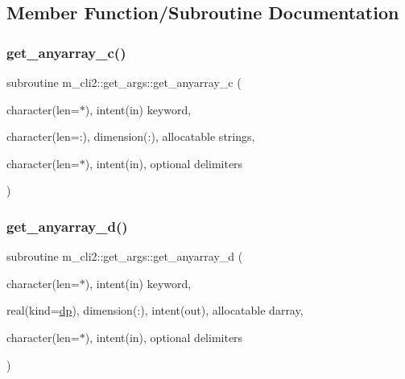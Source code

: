 \subsection{Member Function/\+Subroutine Documentation}
\mbox{\label{interfacem__cli2_1_1get__args_aa60d116ceb254630c102ef174471e375}} 
\subsubsection{\texorpdfstring{get\+\_\+anyarray\+\_\+c()}{get\_anyarray\_c()}}
{\footnotesize\ttfamily subroutine m\+\_\+cli2\+::get\+\_\+args\+::get\+\_\+anyarray\+\_\+c (\begin{DoxyParamCaption}\item[{character(len=$\ast$), intent(in)}]{keyword,  }\item[{character(len=\+:), dimension(\+:), allocatable}]{strings,  }\item[{character(len=$\ast$), intent(in), optional}]{delimiters }\end{DoxyParamCaption})\hspace{0.3cm}{\ttfamily [private]}}

\mbox{\label{interfacem__cli2_1_1get__args_ac1595f7435cd331533eade965bb371dc}} 
\subsubsection{\texorpdfstring{get\+\_\+anyarray\+\_\+d()}{get\_anyarray\_d()}}
{\footnotesize\ttfamily subroutine m\+\_\+cli2\+::get\+\_\+args\+::get\+\_\+anyarray\+\_\+d (\begin{DoxyParamCaption}\item[{character(len=$\ast$), intent(in)}]{keyword,  }\item[{real(kind=\mbox{\hyperlink{namespacem__cli2_acf83f1963cf6a56ad0221cfcf5402440}{dp}}), dimension(\+:), intent(out), allocatable}]{darray,  }\item[{character(len=$\ast$), intent(in), optional}]{delimiters }\end{DoxyParamCaption})\hspace{0.3cm}{\ttfamily [private]}}

